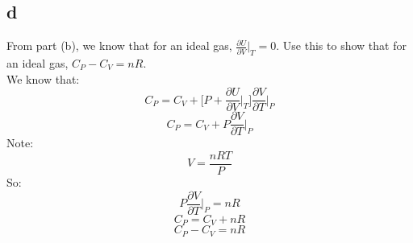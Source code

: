 \documentclass[10pt,a4paper]{article}
\begin{document}
\subsection{d}
From part (b), we know that for an ideal gas, $\frac{\partial U}{\partial V}\biggr |_T=0$. Use this to show that for an ideal gas, $C_P - C_V = nR$.\\

We know that:
$$C_P=C_V+\biggr [P+\frac{\partial U}{\partial V}\biggr |_T\biggr ] \frac{\partial V}{\partial T}\biggr |_P$$
$$C_P=C_V+ P \frac{\partial V}{\partial T}\biggr |_P$$
Note:
$$V=\frac{nRT}{P}$$
So:
$$P\frac{\partial V}{\partial T}\biggr |_P=nR$$
$$C_P=C_V+ nR$$
$$C_P-C_V= nR$$
\end{document}
